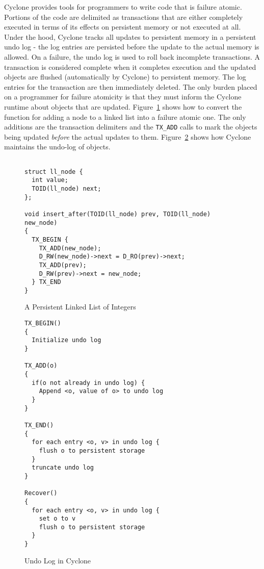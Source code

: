 \documentclass[twocolumn]{article}
\begin{document}
Cyclone provides tools for programmers to write code that is failure
atomic. Portions of the code are delimited as transactions that are either
completely executed in terms of its effects on persistent memory or not executed
at all. Under the hood, Cyclone tracks all updates to persistent memory in a
persistent undo log - the log entries are persisted before the update to the
actual memory is allowed. On a failure, the undo log is used to roll back
incomplete transactions. A transaction is considered complete when it completes
execution and the updated objects are flushed (automatically by Cyclone) to
persistent memory. The log entries for the transaction are then immediately
deleted. The only burden placed on a programmer for failure atomicity is that
they must inform the Cyclone runtime about objects that are
updated. Figure~\ref{fig:example_fatomic} shows how to convert the function for
adding a node to a linked list into a failure atomic one. The only additions are
the transaction delimiters and the {\tt TX\_ADD} calls to mark the objects being
updated \emph{before} the actual updates to them. Figure~\ref{fig:undo_log}
shows how Cyclone maintains the undo-log of objects.


\begin{figure}
{\scriptsize
\begin{verbatim}

struct ll_node {
  int value;
  TOID(ll_node) next;
};

void insert_after(TOID(ll_node) prev, TOID(ll_node) new_node)
{
  TX_BEGIN {
    TX_ADD(new_node);
    D_RW(new_node)->next = D_RO(prev)->next;
    TX_ADD(prev);
    D_RW(prev)->next = new_node;
  } TX_END
}

\end{verbatim}
}
\caption{A Persistent Linked List of Integers}
\label{fig:example_fatomic}
\end{figure}

\begin{figure}
{\scriptsize
\begin{verbatim}
TX_BEGIN()
{
  Initialize undo log
}

TX_ADD(o)
{
  if(o not already in undo log) {
    Append <o, value of o> to undo log
  }
}

TX_END()
{
  for each entry <o, v> in undo log {
    flush o to persistent storage
  }
  truncate undo log
}

Recover()
{
  for each entry <o, v> in undo log {
    set o to v
    flush o to persistent storage
  }   
}

\end{verbatim}
}
\caption{Undo Log in Cyclone}
\label{fig:undo_log}
\end{figure}
\end{document}
